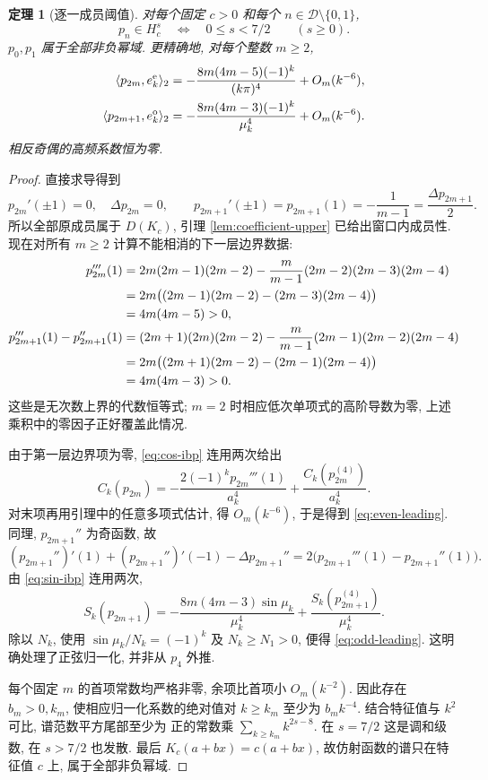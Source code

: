 \documentclass[UTF8]{ctexart}
\newtheorem{theorem}{定理}[section]
\begin{document}
\begin{theorem}[逐一成员阈值]\label{thm:all-thresholds}
对每个固定 $c>0$ 和每个 $n\in\mathcal D\setminus\{0,1\}$,
\[
 p_n\in H_c^s\quad\Longleftrightarrow\quad 0\le s<7/2
 \qquad(s\ge0).
\]
$p_0,p_1$ 属于全部非负幂域. 更精确地, 对每个整数 $m\ge2$,
\begin{align}
 \langle p_{2m},e_k^{\rm e}\rangle_2
 &=-\frac{8m(4m-5)(-1)^k}{(k\pi)^4}+O_m(k^{-6}),\label{eq:even-leading}\\
 \langle p_{2m+1},e_k^{\rm o}\rangle_2
 &=-\frac{8m(4m-3)(-1)^k}{\mu_k^4}+O_m(k^{-6}).\label{eq:odd-leading}
\end{align}
相反奇偶的高频系数恒为零.
\end{theorem}
\begin{proof}
直接求导得到
\[
 p_{2m}'(\pm1)=0,\quad\Delta p_{2m}=0,\qquad
 p_{2m+1}'(\pm1)=p_{2m+1}(1)=-\frac1{m-1}
 =\frac{\Delta p_{2m+1}}2.
\]
所以全部原成员属于 $D(K_c)$, 引理 \ref{lem:coefficient-upper} 已给出窗口内成员性.
现在对所有 $m\ge2$ 计算不能相消的下一层边界数据:
\begin{align}
 p_{2m}'''(1)
 &=2m(2m-1)(2m-2)
 -\frac m{m-1}(2m-2)(2m-3)(2m-4)\notag\\
 &=2m\bigl((2m-1)(2m-2)-(2m-3)(2m-4)\bigr)\notag\\
 &=4m(4m-5)>0,\label{eq:even-boundary}\\
 p_{2m+1}'''(1)-p_{2m+1}''(1)
 &=(2m+1)(2m)(2m-2)
 -\frac m{m-1}(2m-1)(2m-2)(2m-4)\notag\\
 &=2m\bigl((2m+1)(2m-2)-(2m-1)(2m-4)\bigr)\notag\\
 &=4m(4m-3)>0.\label{eq:odd-boundary}
\end{align}
这些是无次数上界的代数恒等式; $m=2$ 时相应低次单项式的高阶导数为零,
上述乘积中的零因子正好覆盖此情况.

由于第一层边界项为零, \eqref{eq:cos-ibp} 连用两次给出
\[
 C_k(p_{2m})
 =-\frac{2(-1)^kp_{2m}'''(1)}{a_k^4}
   +\frac{C_k(p_{2m}^{(4)})}{a_k^4}.
\]
对末项再用引理中的任意多项式估计, 得 $O_m(k^{-6})$,
于是得到 \eqref{eq:even-leading}.
同理, $p_{2m+1}''$ 为奇函数, 故
\[
 (p_{2m+1}'')'(1)+(p_{2m+1}'')'(-1)-\Delta p_{2m+1}''
 =2\bigl(p_{2m+1}'''(1)-p_{2m+1}''(1)\bigr).
\]
由 \eqref{eq:sin-ibp} 连用两次,
\[
 S_k(p_{2m+1})
 =-\frac{8m(4m-3)\sin\mu_k}{\mu_k^4}
   +\frac{S_k(p_{2m+1}^{(4)})}{\mu_k^4}.
\]
除以 $N_k$, 使用 $\sin\mu_k/N_k=(-1)^k$ 及 $N_k\ge N_1>0$,
便得 \eqref{eq:odd-leading}. 这明确处理了正弦归一化, 并非从 $p_4$ 外推.

每个固定 $m$ 的首项常数均严格非零, 余项比首项小 $O_m(k^{-2})$.
因此存在 $b_m>0,k_m$, 使相应归一化系数的绝对值对 $k\ge k_m$
至少为 $b_m k^{-4}$. 结合特征值与 $k^2$ 可比, 谱范数平方尾部至少为
正的常数乘 $\sum_{k\ge k_m}k^{2s-8}$.
在 $s=7/2$ 这是调和级数, 在 $s>7/2$ 也发散.
最后 $K_c(a+bx)=c(a+bx)$, 故仿射函数的谱只在特征值 $c$ 上,
属于全部非负幂域.
\end{proof}
\end{document}
